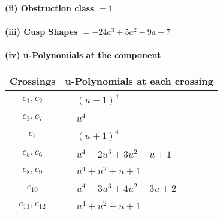 \documentclass[1p]{elsarticle_modified}
\theoremstyle{definition}
\begin{document}
\flushleft \textbf{(ii) Obstruction class $= 1$}\\~\\
\flushleft \textbf{(iii) Cusp Shapes $= -24 a^3+5 a^2-9 a+7$}\\~\\
\newpage\renewcommand{\arraystretch}{1}
\flushleft \textbf{(iv) u-Polynomials at the component}\newline \\
\begin{tabular}{m{50pt}|m{274pt}}
Crossings & \hspace{64pt}u-Polynomials at each crossing \\
\hline $$\begin{aligned}c_{1},c_{2}\end{aligned}$$&$\begin{aligned}
&(u-1)^4
\end{aligned}$\\
\hline $$\begin{aligned}c_{3},c_{7}\end{aligned}$$&$\begin{aligned}
&u^4
\end{aligned}$\\
\hline $$\begin{aligned}c_{4}\end{aligned}$$&$\begin{aligned}
&(u+1)^4
\end{aligned}$\\
\hline $$\begin{aligned}c_{5},c_{6}\end{aligned}$$&$\begin{aligned}
&u^4-2 u^3+3 u^2- u+1
\end{aligned}$\\
\hline $$\begin{aligned}c_{8},c_{9}\end{aligned}$$&$\begin{aligned}
&u^4+u^2+u+1
\end{aligned}$\\
\hline $$\begin{aligned}c_{10}\end{aligned}$$&$\begin{aligned}
&u^4-3 u^3+4 u^2-3 u+2
\end{aligned}$\\
\hline $$\begin{aligned}c_{11},c_{12}\end{aligned}$$&$\begin{aligned}
&u^4+u^2- u+1
\end{aligned}$\\
\hline
\end{tabular}\\~\\
\end{document}
